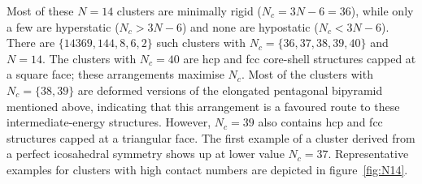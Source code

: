 Most of these $N=14$ clusters are minimally rigid ($N_c=3N-6=36$), while only a
few are hyperstatic ($N_c > 3N-6$) and none are hypostatic ($N_c < 3N-6$). There
are $\{14369,144,8,6,2\}$ such clusters with $N_c=\{36,37,38,39,40\}$ and
$N=14$.  The clusters with $N_c=40$ are \ac{hcp} and \ac{fcc} core-shell
structures capped at a square face; these arrangements maximise $N_c$. Most of
the clusters with $N_c=\{38,39\}$ are deformed versions of the elongated
pentagonal bipyramid mentioned above, indicating that this arrangement is a
favoured route to these intermediate-energy structures.  However, $N_c=39$ also
contains \ac{hcp} and \ac{fcc} structures capped at a triangular face.  The
first example of a cluster derived from a perfect icosahedral symmetry shows up
at lower value $N_c=37$.  Representative examples for clusters with high
contact numbers are depicted in figure~\ref{fig:N14}.  
%
